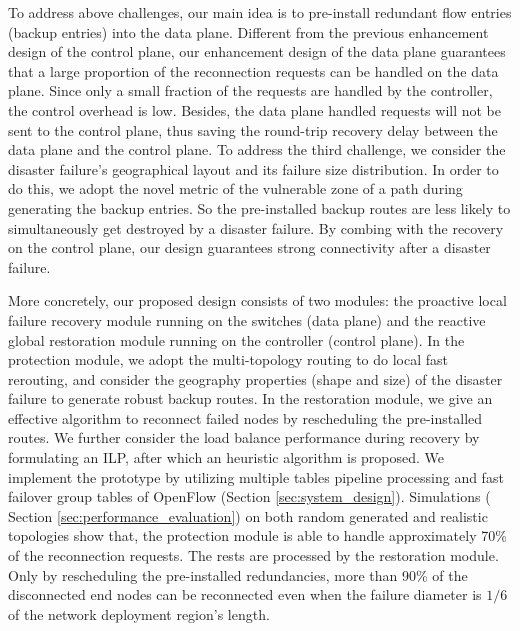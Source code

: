 \documentclass[10pt,journal]{IEEEtran}
\begin{document}
To address above challenges, our main idea is to pre-install redundant flow entries (backup entries) into the data plane. Different from the previous enhancement design of the control plane, our enhancement design of the data plane guarantees that a large proportion of the reconnection requests can be handled on the data plane. Since only a small fraction of the requests are handled by the controller, the control overhead is low. Besides, the data plane handled requests will not be sent to the control plane, thus saving the round-trip recovery delay between the data plane and the control plane. To address the third challenge, we consider the disaster failure's geographical layout and its failure size distribution. In order to do this, we adopt the novel metric of the vulnerable zone of a path during generating the backup entries. So the pre-installed backup routes are less likely to simultaneously get destroyed by a disaster failure. By combing with the recovery on the control plane, our design guarantees strong connectivity after a disaster failure.

More concretely, our proposed design consists of two modules: the proactive local failure recovery module running on the switches (data plane) and the reactive global restoration module running on the controller (control plane). In the protection module, we adopt the multi-topology routing to do local fast rerouting, and consider the geography properties (shape and size) of the disaster failure to generate robust backup routes. In the restoration module, we give an effective algorithm to reconnect failed nodes by rescheduling the pre-installed routes. We further consider the load balance performance during recovery by formulating an ILP, after which an heuristic algorithm is proposed. We implement the prototype by utilizing multiple tables pipeline processing and fast failover group tables of OpenFlow (Section \ref{sec:system_design}).
Simulations ( Section \ref{sec:performance_evaluation}) on both random generated and realistic topologies show that, the protection module is able to handle approximately 70\% of the reconnection requests. The rests are processed by the restoration module. Only by rescheduling the pre-installed redundancies, more than 90\% of the disconnected end nodes can be reconnected even when the failure diameter is $1/6$ of the network deployment region's length.
\end{document}
